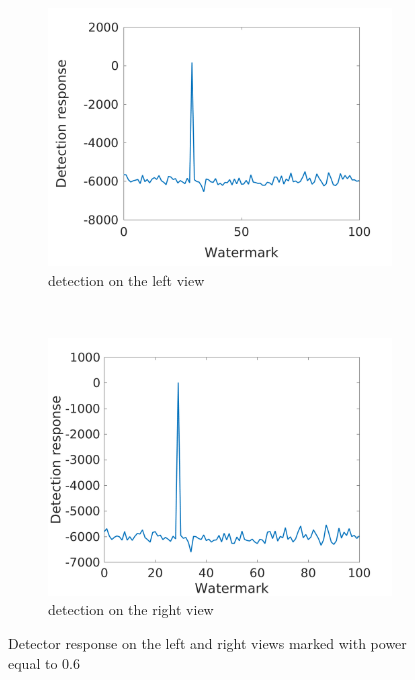 \begin{figure}[h!]
    \centering
    \begin{subfigure}[t]{0.5\textwidth}
        \centering
\includegraphics[width=1\textwidth]{./img/likelihood/correct_LikelihoodL_06.png}
          \caption{\small{detection on the left view}}
\label{fig:Ll06}

    \end{subfigure}%
    ~ 
    \begin{subfigure}[t]{0.5\textwidth}
        \centering
\includegraphics[width=1\textwidth]{./img/likelihood/correct_LikelihoodLr_06.png}
           \caption{\small{detection on the right view}}
\label{fig:Lr06}
    \end{subfigure}
    \caption{Detector response on the left and right views marked with power equal to 0.6}
     \label{fig:Ll}
\end{figure}


